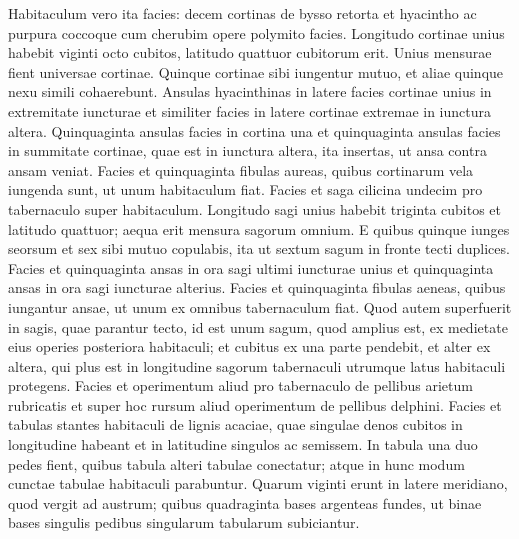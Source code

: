 \begin{biblechapter}
\begin{biblechapter}
\begin{biblechapter}
\begin{biblechapter}
\begin{biblechapter}
\begin{biblechapter}
\begin{biblechapter}
\begin{biblechapter}
\begin{biblechapter}
\begin{biblechapter}
\begin{biblechapter}
\begin{biblechapter}
\begin{biblechapter}
\begin{biblechapter}
\begin{biblechapter}
\begin{biblechapter}
\begin{biblechapter}
\begin{biblechapter}
\begin{biblechapter}
\begin{biblechapter}
\begin{biblechapter}
\begin{biblechapter}
\begin{biblechapter}
\begin{biblechapter}
\begin{biblechapter}
\begin{biblechapter}
\verse Habitaculum vero ita facies: decem cortinas de bysso retorta et hyacintho ac purpura coccoque cum cherubim opere polymito facies. 
\verse Longitudo cortinae unius habebit viginti octo cubitos, latitudo quattuor cubitorum erit. Unius mensurae fient universae cortinae. 
\verse Quinque cortinae sibi iungentur mutuo, et aliae quinque nexu simili cohaerebunt. 
\verse Ansulas hyacinthinas in latere facies cortinae unius in extremitate iuncturae et similiter facies in latere cortinae extremae in iunctura altera. 
\verse Quinquaginta ansulas facies in cortina una et quinquaginta ansulas facies in summitate cortinae, quae est in iunctura altera, ita insertas, ut ansa contra ansam veniat. 
\verse Facies et quinquaginta fibulas aureas, quibus cortinarum vela iungenda sunt, ut unum habitaculum fiat.
 \verse Facies et saga cilicina undecim pro tabernaculo super habitaculum. 
\verse Longitudo sagi unius habebit triginta cubitos et latitudo quattuor; aequa erit mensura sagorum omnium. 
\verse E quibus quinque iunges seorsum et sex sibi mutuo copulabis, ita ut sextum sagum in fronte tecti duplices. 
\verse Facies et quinquaginta ansas in ora sagi ultimi iuncturae unius et quinquaginta ansas in ora sagi iuncturae alterius. 
\verse Facies et quinquaginta fibulas aeneas, quibus iungantur ansae, ut unum ex omnibus tabernaculum fiat. 
\verse Quod autem superfuerit in sagis, quae parantur tecto, id est unum sagum, quod amplius est, ex medietate eius operies posteriora habitaculi; 
\verse et cubitus ex una parte pendebit, et alter ex altera, qui plus est in longitudine sagorum tabernaculi utrumque latus habitaculi protegens.
 \verse Facies et operimentum aliud pro tabernaculo de pellibus arietum rubricatis et super hoc rursum aliud operimentum de pellibus delphini.
 \verse Facies et tabulas stantes habitaculi de lignis acaciae, 
\verse quae singulae denos cubitos in longitudine habeant et in latitudine singulos ac semissem. 
 \verse In tabula una duo pedes fient, quibus tabula alteri tabulae conectatur; atque in hunc modum cunctae tabulae habitaculi parabuntur. 
\verse Quarum viginti erunt in latere meridiano, quod vergit ad austrum; 
\verse quibus quadraginta bases argenteas fundes, ut binae bases singulis pedibus singularum tabularum subiciantur. 

\end{biblechapter}
\end{biblechapter}
\end{biblechapter}
\end{biblechapter}
\end{biblechapter}
\end{biblechapter}
\end{biblechapter}
\end{biblechapter}
\end{biblechapter}
\end{biblechapter}
\end{biblechapter}
\end{biblechapter}
\end{biblechapter}
\end{biblechapter}
\end{biblechapter}
\end{biblechapter}
\end{biblechapter}
\end{biblechapter}
\end{biblechapter}
\end{biblechapter}
\end{biblechapter}
\end{biblechapter}
\end{biblechapter}
\end{biblechapter}
\end{biblechapter}
\end{biblechapter}

